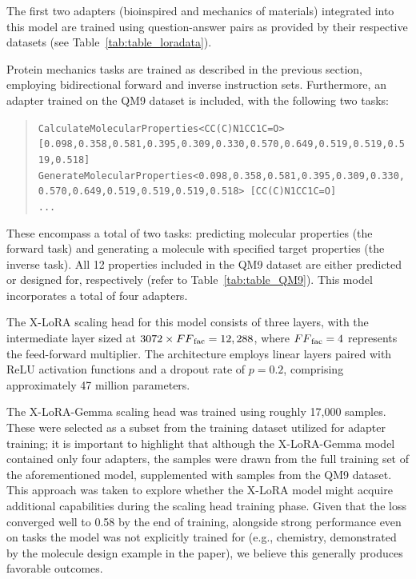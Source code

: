The first two adapters (bioinspired and mechanics of materials) integrated into this model are trained using question-answer pairs as provided by their respective datasets (see Table~\ref{tab:table_loradata}).

Protein mechanics tasks are trained as described in the previous section, employing bidirectional forward and inverse instruction sets. Furthermore, an adapter trained on the QM9 dataset is included, with the following two tasks:

\begin{quote}
\tiny {\texttt{CalculateMolecularProperties<CC(C)N1CC1C=O> [0.098,0.358,0.581,0.395,0.309,0.330,0.570,0.649,0.519,0.519,0.519,0.518]\\
GenerateMolecularProperties<0.098,0.358,0.581,0.395,0.309,0.330,0.570,0.649,0.519,0.519,0.519,0.518> [CC(C)N1CC1C=O]\\ 
...
}}
\end{quote}

These encompass a total of two tasks: predicting molecular properties (the forward task) and generating a molecule with specified target properties (the inverse task). All 12 properties included in the QM9 dataset are either predicted or designed for, respectively (refer to Table~\ref{tab:table_QM9}).  
This model incorporates a total of four adapters.

The X-LoRA scaling head for this model consists of three layers, with the intermediate layer sized at $3072 \times {FF}_{\rm fac} = 12,288$, where ${FF}_{\rm fac}=4$ represents the feed-forward multiplier. The architecture employs linear layers paired with ReLU activation functions and a dropout rate of $p=0.2$, comprising approximately 47 million parameters.

The X-LoRA-Gemma scaling head was trained using roughly 17,000 samples. These were selected as a subset from the training dataset utilized for adapter training; it is important to highlight that although the X-LoRA-Gemma model contained only four adapters, the samples were drawn from the full training set of the aforementioned model, supplemented with samples from the QM9 dataset. This approach was taken to explore whether the X-LoRA model might acquire additional capabilities during the scaling head training phase. Given that the loss converged well to 0.58 by the end of training, alongside strong performance even on tasks the model was not explicitly trained for (e.g., chemistry, demonstrated by the molecule design example in the paper), we believe this generally produces favorable outcomes.

